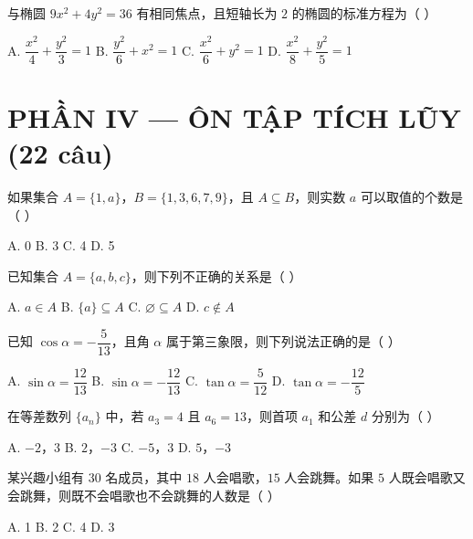 \documentclass[11pt, a4paper]{article}
\begin{document}
\begin{baitap}[26]
与椭圆 $9x^2 + 4y^2 = 36$ 有相同焦点，且短轴长为 $2$ 的椭圆的标准方程为（ ）
\par\vspace{3pt}
\noindent A. $\dfrac{x^2}{4} + \dfrac{y^2}{3} = 1$ \quad B. $\dfrac{y^2}{6} + x^2 = 1$ \quad C. $\dfrac{x^2}{6} + y^2 = 1$ \quad D. $\dfrac{x^2}{8} + \dfrac{y^2}{5} = 1$
\end{baitap}

\section{PHẦN IV — ÔN TẬP TÍCH LŨY (22 câu)}

\begin{baitap}[27]
如果集合 $A = \{1, a\}$，$B = \{1, 3, 6, 7, 9\}$，且 $A \subseteq B$，则实数 $a$ 可以取值的个数是（ ）
\par\vspace{3pt}
\noindent A. 0 \quad B. 3 \quad C. 4 \quad D. 5
\end{baitap}

\begin{baitap}[28]
已知集合 $A = \{a, b, c\}$，则下列不正确的关系是（ ）
\par\vspace{3pt}
\noindent A. $a \in A$ \quad B. $\{a\} \subseteq A$ \quad C. $\varnothing \subseteq A$ \quad D. $c \notin A$
\end{baitap}

\begin{baitap}[29]
已知 $\cos\alpha = -\dfrac{5}{13}$，且角 $\alpha$ 属于第三象限，则下列说法正确的是（ ）
\par\vspace{3pt}
\noindent A. $\sin\alpha = \dfrac{12}{13}$ \quad B. $\sin\alpha = -\dfrac{12}{13}$ \quad C. $\tan\alpha = \dfrac{5}{12}$ \quad D. $\tan\alpha = -\dfrac{12}{5}$
\end{baitap}

\begin{baitap}[30]
在等差数列 $\{a_n\}$ 中，若 $a_3 = 4$ 且 $a_6 = 13$，则首项 $a_1$ 和公差 $d$ 分别为（ ）
\par\vspace{3pt}
\noindent A. $-2$，$3$ \quad B. $2$，$-3$ \quad C. $-5$，$3$ \quad D. $5$，$-3$
\end{baitap}

\begin{baitap}[31]
某兴趣小组有 $30$ 名成员，其中 $18$ 人会唱歌，$15$ 人会跳舞。如果 $5$ 人既会唱歌又会跳舞，则既不会唱歌也不会跳舞的人数是（ ）
\par\vspace{3pt}
\noindent A. 1 \quad B. 2 \quad C. 4 \quad D. 3
\end{baitap}
\end{document}
